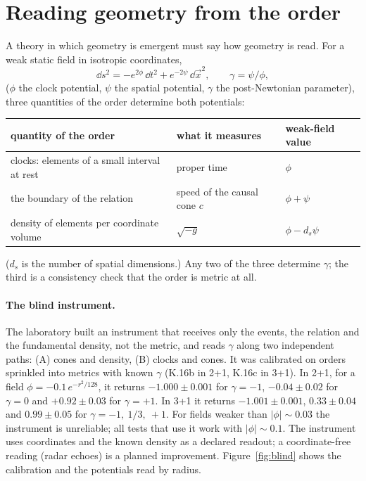 \section{Reading geometry from the order}\label{sec:reading}

A theory in which geometry is emergent must say how geometry is read. For a weak static field in
isotropic coordinates,
\begin{equation}\label{eq:weakmetric}
  \dd s^2=-e^{2\phi}\,\dd t^2+e^{-2\psi}\,\dd\vec x^2,\qquad \gamma=\psi/\phi,
\end{equation}
($\phi$ the clock potential, $\psi$ the spatial potential, $\gamma$ the post-Newtonian parameter),
three quantities of the order determine both potentials:

\begin{center}
\begin{tabular}{lll}
\toprule
quantity of the order & what it measures & weak-field value\\
\midrule
clocks: elements of a small interval at rest & proper time & $\phi$\\
the boundary of the relation & speed of the causal cone $c$ & $\phi+\psi$\\
density of elements per coordinate volume & $\sqrt{-g}$ & $\phi-d_s\psi$\\
\bottomrule
\end{tabular}
\end{center}
($d_s$ is the number of spatial dimensions.) Any two of the three determine $\gamma$; the third is a
consistency check that the order is metric at all.

\paragraph{The blind instrument.} The laboratory built an instrument that receives only the events,
the relation and the fundamental density, not the metric, and reads $\gamma$ along two independent
paths: (A) cones and density, (B) clocks and cones. It was calibrated on orders sprinkled into
metrics with known $\gamma$ (K.16b in 2+1, K.16c in 3+1). In 2+1, for a field
$\phi=-0.1\,e^{-r^2/128}$, it returns $-1.000\pm0.001$ for $\gamma=-1$, $-0.04\pm0.02$ for $\gamma=0$
and $+0.92\pm0.03$ for $\gamma=+1$. In 3+1 it returns $-1.001\pm0.001$, $0.33\pm0.04$ and
$0.99\pm0.05$ for $\gamma=-1,\ 1/3,\ +1$. For fields weaker than $|\phi|\sim0.03$ the instrument is
unreliable; all tests that use it work with $|\phi|\sim0.1$. The instrument uses coordinates and
the known density as a declared readout; a coordinate-free reading (radar echoes) is a planned
improvement. Figure~\ref{fig:blind} shows the calibration and the potentials read by radius.

